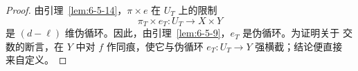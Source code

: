\begin{proof}
由引理~\ref{lem:6-5-14}，$\pi\times e$ 在 $U_T$ 上的限制
\[
  \pi_T\times e_T:U_T\longrightarrow X\times Y
\]
是 $(d-\ell)$ 维伪循环。因此，由引理~\ref{lem:6-5-9}，$e_T$ 是伪循环。为证明关于
交数的断言，在 $Y$ 中对 $f$ 作同痕，使它与伪循环 $e_T:U_T\to Y$ 强横截；结论便直接
来自定义。
\end{proof}
